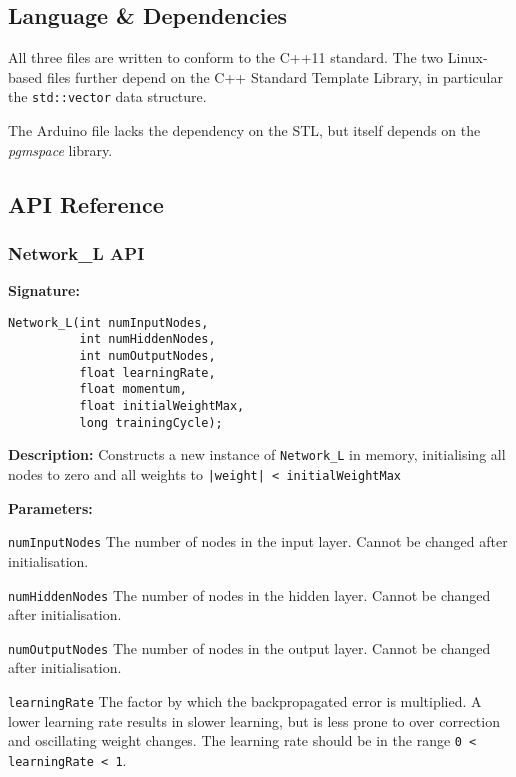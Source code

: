 \documentclass[a4paper]{article}
\begin{document}
\subsection{Language \& Dependencies}%

All three files are written to conform to the C++11 standard\cite{nnref0}. The two Linux-based files further depend on the C++ Standard Template Library, in particular the \lstinline{std::vector} data structure.

The Arduino file lacks the dependency on the STL, but itself depends on the \textit{pgmspace} library.\cite{nnref1}

\subsection{API Reference}%

\subsubsection{Network\_L API}%


\hrulefill %

\textbf{Signature:} \begin{lstlisting} 
Network_L(int numInputNodes,
          int numHiddenNodes,
          int numOutputNodes,
          float learningRate,
          float momentum,
          float initialWeightMax,
          long trainingCycle);
\end{lstlisting}

\textbf{Description: }
Constructs a new instance of \lstinline{Network_L} in memory, initialising all nodes to zero and all weights to \lstinline{|weight| < initialWeightMax}

\textbf{Parameters: }

\lstinline{numInputNodes} The number of nodes in the input layer. Cannot be changed after initialisation.

\lstinline{numHiddenNodes} The number of nodes in the hidden layer. Cannot be changed after initialisation.

\lstinline{numOutputNodes} The number of nodes in the output layer. Cannot be changed after initialisation.

\lstinline{learningRate} The factor by which the backpropagated error is multiplied. A lower learning rate results in slower learning, but is less prone to over correction and oscillating weight changes. The learning rate should be in the range \lstinline{0 < learningRate < 1}.
\end{document}
